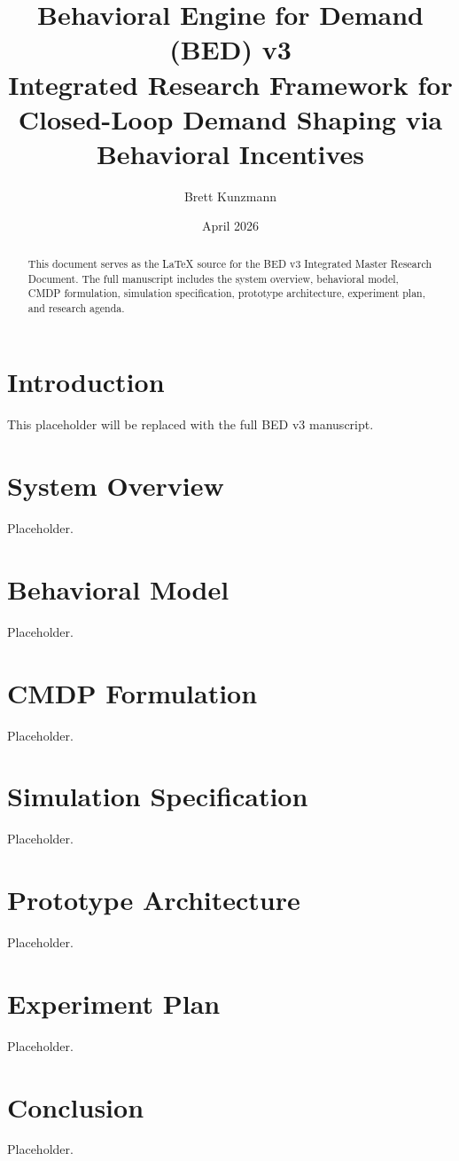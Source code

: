 \documentclass[12pt]{article}
\title{Behavioral Engine for Demand (BED) v3 \\
Integrated Research Framework for Closed-Loop Demand Shaping via Behavioral Incentives}
\author{Brett Kunzmann}
\date{April 2026}
\begin{document}
\maketitle

\begin{abstract}
This document serves as the LaTeX source for the BED v3 Integrated Master
Research Document. The full manuscript includes the system overview, behavioral
model, CMDP formulation, simulation specification, prototype architecture,
experiment plan, and research agenda.
\end{abstract}

\section{Introduction}
This placeholder will be replaced with the full BED v3 manuscript.

\section{System Overview}
Placeholder.

\section{Behavioral Model}
Placeholder.

\section{CMDP Formulation}
Placeholder.

\section{Simulation Specification}
Placeholder.

\section{Prototype Architecture}
Placeholder.

\section{Experiment Plan}
Placeholder.

\section{Conclusion}
Placeholder.
\end{document}
